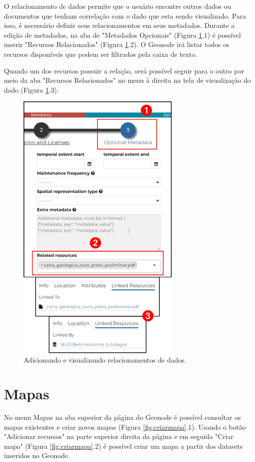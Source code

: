 \documentclass[12pt]{article}
\begin{document}
O relacionamento de dados permite que o usuário encontre outros dados ou
documentos que tenham correlação com o dado que esta sendo visualizado. Para
isso, é necessário definir seus relacionamentos em seus metadados. Durante a
edição de metadados, na aba de "Metadados Opcionais" (Figura
\ref{fig:relacionamentos}.1) é possível inserir "Recursos Relacionados" (Figura
\ref{fig:relacionamentos}.2). O Geonode irá listar todos os recursos
disponíveis que podem ser filtrados pela caixa de texto.

Quando um dos recursos possuir a relação, será possível seguir para o outro por
meio da aba "Recursos Relacionados" no menu à direita na tela de visualização
do dado (Figura \ref{fig:relacionamentos}.3).

\begin{figure}[ht]
  \centering
  \includegraphics[width=8cm, keepaspectratio]{img/relacionamentos.pdf}
  \caption{Adicionando e visualizando relacionamentos de dados.}
  \label{fig:relacionamentos}
\end{figure}

\section{Mapas}

No menu Mapas na aba superior da página do Geonode é possível consultar os
mapas existentes e criar novos mapas (Figura \ref{fig:criarmapa}.1). Usando o
botão "Adicionar recursos" na parte superior direita da página e em seguida
"Criar mapa" (Figura \ref{fig:criarmapa}.2) é possível criar um mapa a partir
dos datasets inseridos no Geonode.
\end{document}

